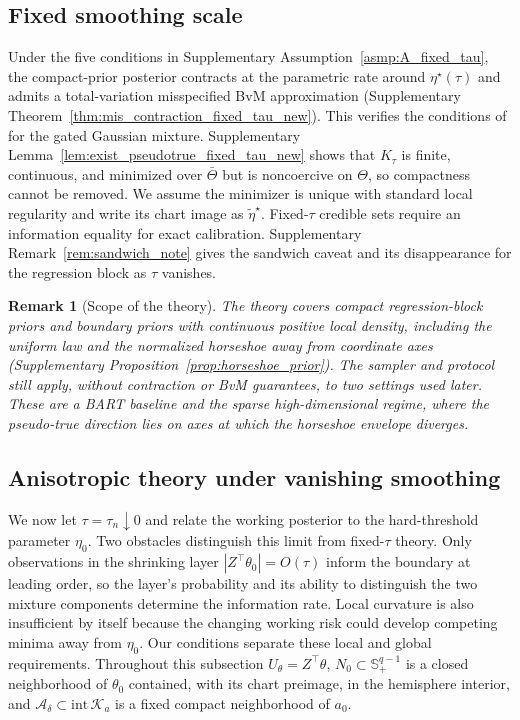 \documentclass[11pt]{article}
\theoremstyle{definition}
\theoremstyle{plain}
\newtheorem{remark}{Remark}
\begin{document}
\subsection{Fixed smoothing scale}
\label{sec:posterior_contraction_BvM_fixed_tau_new}

Under the five conditions in Supplementary Assumption~\ref{asmp:A_fixed_tau}, the compact-prior posterior contracts at the parametric rate around $\eta^\star(\tau)$ and admits a total-variation misspecified BvM approximation (Supplementary Theorem~\ref{thm:mis_contraction_fixed_tau_new}). This verifies the conditions of \citet{Kleijn2012} for the gated Gaussian mixture. Supplementary Lemma~\ref{lem:exist_pseudotrue_fixed_tau_new} shows that $K_\tau$ is finite, continuous, and minimized over $\bar\Theta$ but is noncoercive on $\Theta$, so compactness cannot be removed. We assume the minimizer is unique with standard local regularity and write its chart image as $\tilde\eta^\star$. Fixed-$\tau$ credible sets require an information equality for exact calibration. Supplementary Remark~\ref{rem:sandwich_note} gives the sandwich caveat and its disappearance for the regression block as $\tau$ vanishes.

\begin{remark}[Scope of the theory]
\label{rem:scope_theory}
The theory covers compact regression-block priors and boundary priors with continuous positive local density, including the uniform law and the normalized horseshoe away from coordinate axes (Supplementary Proposition~\ref{prop:horseshoe_prior}). The sampler and protocol still apply, without contraction or BvM guarantees, to two settings used later. These are a BART baseline and the sparse high-dimensional regime, where the pseudo-true direction lies on axes at which the horseshoe envelope diverges.
\end{remark}

\subsection{Anisotropic theory under vanishing smoothing}
\label{sec:asymptotic_tau_new}

We now let $\tau=\tau_n\downarrow0$ and relate the working posterior to the hard-threshold parameter $\eta_0$. Two obstacles distinguish this limit from fixed-$\tau$ theory. Only observations in the shrinking layer $|Z^\top\theta_0|=O(\tau)$ inform the boundary at leading order, so the layer's probability and its ability to distinguish the two mixture components determine the information rate. Local curvature is also insufficient by itself because the changing working risk could develop competing minima away from $\eta_0$. Our conditions separate these local and global requirements. Throughout this subsection $U_\theta=Z^\top\theta$, $N_0\subset\mathbb S^{q-1}_+$ is a closed neighborhood of $\theta_0$ contained, with its chart preimage, in the hemisphere interior, and $\mathcal A_\delta\subset\mathrm{int}\,\mathcal K_a$ is a fixed compact neighborhood of $a_0$.
\end{document}
